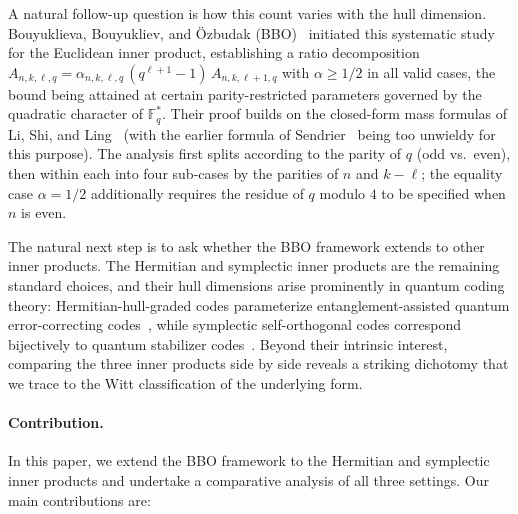 \documentclass[11pt]{article}
\theoremstyle{plain}
\theoremstyle{remark}
\newcommand{\F}{\mathbb{F}}
\begin{document}
A natural follow-up question is how this count varies with the hull dimension.
Bouyuklieva, Bouyukliev, and \"Ozbudak (BBO)~\cite{BBOz2026} initiated this systematic study
for the Euclidean inner product, establishing a ratio decomposition
$A_{n,k,\ell,q} = \alpha_{n,k,\ell,q}\,(q^{\ell+1}-1)\, A_{n,k,\ell+1,q}$
with $\alpha \geq 1/2$ in all valid cases, the bound being attained at certain
parity-restricted parameters governed by the quadratic character of $\F_q^*$.
Their proof builds on the closed-form mass formulas of Li, Shi, and
Ling~\cite{LiShiLing2024} (with the earlier formula of
Sendrier~\cite{Sendrier1997} being too unwieldy for this purpose). The
analysis first splits according to the parity of $q$ (odd vs.\ even),
then within each into four sub-cases by the parities of $n$ and $k - \ell$;
the equality case $\alpha = 1/2$ additionally requires the residue of $q$
modulo $4$ to be specified when $n$ is even.

The natural next step is to ask whether the BBO framework extends to other
inner products. The Hermitian and symplectic inner products are the
remaining standard choices, and their hull dimensions arise prominently in
quantum coding theory: Hermitian-hull-graded codes parameterize entanglement-assisted
quantum error-correcting codes~\cite{BDH2006,Dcc-EAqecc}, while symplectic
self-orthogonal codes correspond bijectively to quantum stabilizer
codes~\cite{KKKS2006}. Beyond their intrinsic interest, comparing the three
inner products side by side reveals a striking dichotomy that we trace to
the Witt classification of the underlying form.

\paragraph{Contribution.}
In this paper, we extend the BBO framework to the Hermitian and symplectic inner
products and undertake a comparative analysis of all three settings.
Our main contributions are:
\end{document}

